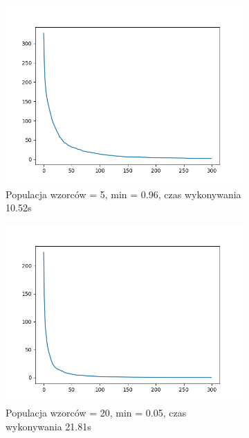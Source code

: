 \documentclass[12pt]{article}
\begin{document}
\begin{figure}[H]
    \centering
    \begin{subfigure}{0.32\textwidth}
        \centering
        \includegraphics[width=\linewidth]{plots/s6.png}
        \caption{Populacja wzorców = 5, min = 0.96, czas wykonywania 10.52s}
    \end{subfigure}
    \begin{subfigure}{0.32\textwidth}
        \centering
        \includegraphics[width=\linewidth]{plots/s7.png}
        \caption{Populacja wzorców = 20, min = 0.05, czas wykonywania 21.81s}
    \end{subfigure}
    \begin{subfigure}{0.32\textwidth}
        \centering

\end{subfigure}
\end{figure}
\end{document}
